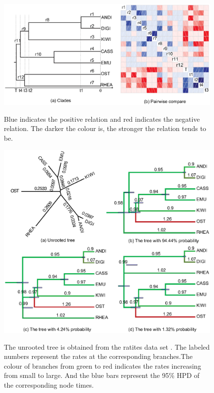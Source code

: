 \documentclass{bmcart}
\begin{document}
\begin{backmatter}
\begin{figure}[h!]
\includegraphics[width=12cm]{Fig16-correlation.eps}\\
\caption{
             Blue indicates the positive relation and red indicates the negative relation. The darker the colour is, the stronger the relation tends to be.}
\label{correlation}
\end{figure}

\begin{figure}[h!]
\includegraphics[width=12cm]{Fig17-fixedtree.eps}\\
\caption{
            The unrooted tree is obtained from the ratites data set \cite{cooper2001complete}. The labeled numbers represent the rates at the corresponding branches.The colour of branches from green to red indicates the rates increasing from small to large. And the blue bars represent the 95\% HPD of the corresponding node times.}
\label{withoutdata}
\end{figure}


\end{backmatter}
\end{document}

